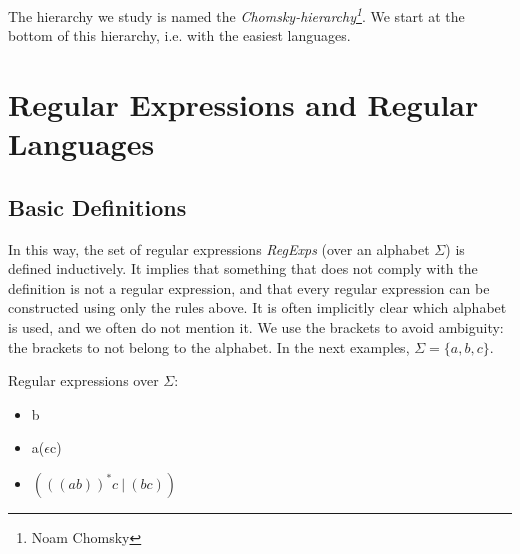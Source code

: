 The hierarchy we study is named the {\em
Chomsky-hierarchy\footnote{Noam Chomsky}}. We start at the bottom of
this hierarchy, i.e. with the easiest languages.



\chapter{Regular Expressions and Regular Languages}

\section{Basic Definitions}


In this way, the set of regular expressions {\em RegExps} (over an
alphabet $\Sigma$) is defined inductively. It implies that something
that does not comply with the definition is not a regular expression,
and that every regular expression can be constructed using only the
rules above.
%
It is often implicitly clear which alphabet is used, and we often do
not mention it.
%
We use the brackets to avoid ambiguity: the brackets to not belong to
the alphabet.
%
In the next examples, $\Sigma = \{a,b,c\}$.


\begin{vb}
Regular expressions over $\Sigma$:
\begin{itemize}
\item b
\item a($\epsilon$c)
\item $(((ab))^*c~|~(bc))$
\end{itemize}
\end{vb}

